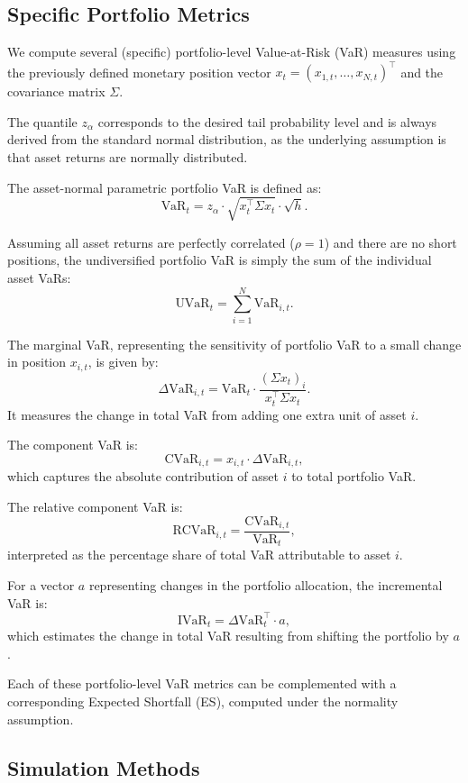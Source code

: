 \documentclass{article}
\begin{document}
\subsection{Specific Portfolio Metrics}

We compute several (specific) portfolio-level Value-at-Risk (VaR) measures using the previously defined monetary position vector \( x_t = (x_{1,t}, \dots, x_{N,t})^\top \) and the covariance matrix \( \Sigma \).

The quantile \( z_\alpha \) corresponds to the desired tail probability level and is always derived from the standard normal distribution, as the underlying assumption is that asset returns are normally distributed.

The asset-normal parametric portfolio VaR is defined as:
\[
  \text{VaR}_t = z_\alpha \cdot \sqrt{x_t^\top \Sigma x_t} \cdot \sqrt{h}.
\]

Assuming all asset returns are perfectly correlated (\( \rho = 1 \)) and there are no short positions, the undiversified portfolio VaR is simply the sum of the individual asset VaRs:
\[
  \text{UVaR}_t = \sum_{i=1}^N \text{VaR}_{i,t}.
\]

The marginal VaR, representing the sensitivity of portfolio VaR to a small change in position \( x_{i,t} \), is given by:
\[
  \Delta \text{VaR}_{i,t} = \text{VaR}_t \cdot \frac{(\Sigma x_t)_i}{x_t^\top \Sigma x_t}.
\]
It measures the change in total VaR from adding one extra unit of asset \( i \).

The component VaR is:
\[
  \text{CVaR}_{i,t} = x_{i,t} \cdot \Delta \text{VaR}_{i,t},
\]
which captures the absolute contribution of asset \( i \) to total portfolio VaR.

The relative component VaR is:
\[
  \text{RCVaR}_{i,t} = \frac{\text{CVaR}_{i,t}}{\text{VaR}_t},
\]
interpreted as the percentage share of total VaR attributable to asset \( i \).

For a vector \( a \) representing changes in the portfolio allocation, the incremental VaR is:
\[
  \text{IVaR}_t = \Delta \text{VaR}_t^\top \cdot a,
\]
which estimates the change in total VaR resulting from shifting the portfolio by \( a \).

Each of these portfolio-level VaR metrics can be complemented with a corresponding Expected Shortfall (ES), computed under the normality assumption.


\subsection{Simulation Methods}
\end{document}
